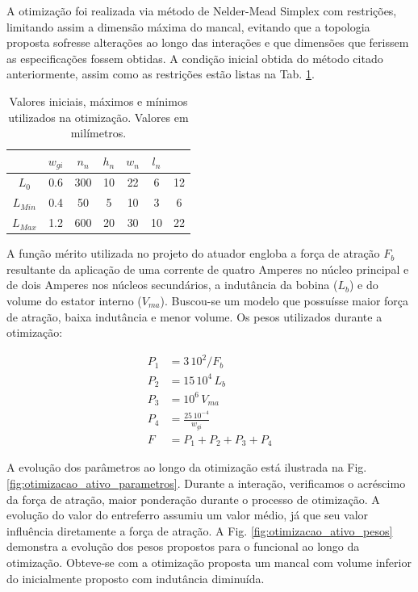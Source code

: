 A otimização foi realizada via método de Nelder-Mead Simplex com restrições, limitando assim a dimensão máxima do mancal, evitando que a topologia proposta sofresse alterações ao longo das interações e que dimensões que ferissem as especificações fossem obtidas. A condição inicial obtida do método citado anteriormente, assim como as restrições estão listas na Tab. \ref{tab:ativo:restrições}.

\begin{table}[ht!]
	\centering
	\begin{tabular}{c c c c c c c}
					 & $w_{gi}$ & $n_n$ & $h_n$ & $w_n$ &  $l_n$   \\ \hline \hline
		$L_{0}$  &  0.6 & 300  &   10 &  22 & 6  &   12 \\
		$L_{Min}$&  0.4 & 50   &   5  &  10 & 3  &   6	\\
		$L_{Max}$ & 1.2 & 600  &   20 &  30 & 10 &   22
	\end{tabular} 
	\caption{Valores iniciais, máximos e mínimos utilizados na otimização. Valores em milímetros.}
	\label{tab:ativo:restrições} 
\end{table}

A função mérito utilizada no projeto do atuador engloba a força de atração $F_b$ resultante da aplicação de uma corrente de quatro Amperes no núcleo principal e de dois Amperes nos núcleos secundários, a indutância da bobina ($L_b$) e do volume do estator interno ($V_{ma}$). Buscou-se um modelo que possuísse maior força de atração, baixa indutância e menor volume. Os pesos utilizados durante a otimização: 

\begin{align}
	P_1 &= 3 \, 10^2/ F_b \\
	P_2 &= 15 \, 10^4 \, L_b \\
	P_3 &= 10^6 \, V_{ma} \\
	P_4 &= \frac{25 \, 10^{-4}}{w_{gi}}				\\
	F   &= P_1 + P_2 + P_3 + P_4
\end{align}

A evolução dos parâmetros ao longo da otimização está ilustrada na Fig. \ref{fig:otimizacao_ativo_parametros}. Durante a interação, verificamos o acréscimo da força de atração, maior ponderação durante o processo de otimização.  A evolução do valor do entreferro assumiu um valor médio, já que seu valor influência diretamente a força de atração. A Fig. \ref{fig:otimizacao_ativo_pesos} demonstra a evolução dos pesos propostos para o funcional ao longo da otimização. Obteve-se com a otimização proposta um mancal com volume inferior do inicialmente proposto com indutância diminuída.

